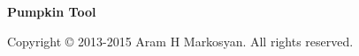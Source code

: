 \documentclass[11pt]{book}
\begin{document}

\begin{TitlePage}

\vfill
\begin{center}
\Huge
\textbf{Pumpkin Tool}
\end{center}
\vfill
{}
\medskip \noindent
\begin{center}
\sf Copyright \copyright{} 2013-2015 Aram H Markosyan. All rights
reserved.
\end{center}
\end{TitlePage}


\begin{CopyrightPage}

\end{CopyrightPage}


\tableofcontents
\cleardoublepage
{}









\appendix








% 





\end{document}
